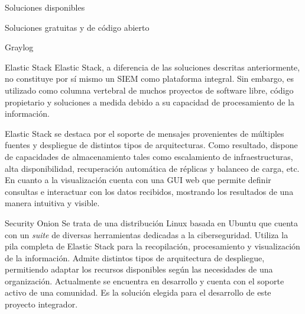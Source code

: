 \begin{section}{Soluciones disponibles}
\begin{subsection}{Soluciones gratuitas y de código abierto}
\begin{subsubsection}{Graylog}
            \end{subsubsection}
            \begin{subsubsection}{Elastic Stack}
            Elastic Stack\cite{elastic}, a diferencia de las soluciones descritas anteriormente, no constituye por sí mismo un SIEM como plataforma integral. Sin embargo, es utilizado como columna vertebral de muchos proyectos de software libre, código propietario y soluciones a medida debido a su capacidad de procesamiento de la información. \par
        	Elastic Stack se destaca por el soporte de mensajes provenientes de múltiples fuentes y despliegue de distintos tipos de arquitecturas. Como resultado, dispone de capacidades de almacenamiento tales como escalamiento de infraestructuras, alta disponibilidad, recuperación automática de réplicas y balanceo de carga, etc. En cuanto a la visualización cuenta con una GUI web que permite definir consultas e interactuar con los datos recibidos, mostrando los resultados de una manera intuitiva y visible. 

            \end{subsubsection}
            \begin{subsubsection}{Security Onion}
            Se trata de una distribución Linux basada en Ubuntu \cite{ubuntu} que cuenta con un \textit{suite} de diversas herramientas dedicadas a la ciberseguridad. Utiliza la pila completa de Elastic Stack para la recopilación, procesamiento y visualización de la información. Admite distintos tipos de arquitectura de despliegue, permitiendo adaptar los recursos disponibles según las necesidades de una organización. Actualmente se encuentra en desarrollo y cuenta con el soporte activo de una comunidad. Es la solución elegida para el desarrollo de este proyecto integrador.
            \end{subsubsection}
            
        \end{subsection} 
    \end{section}
